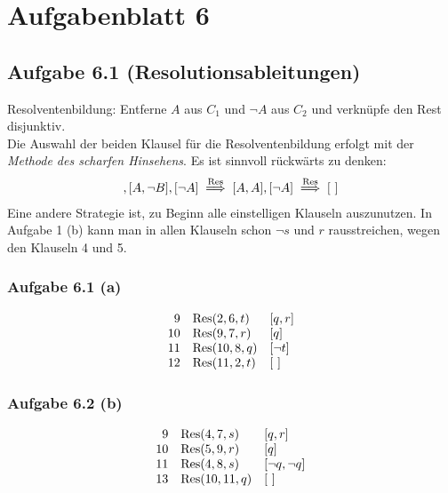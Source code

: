 
\section{Aufgabenblatt 6}
\subsection{Aufgabe 6.1 (Resolutionsableitungen)}
Resolventenbildung: Entferne $A$ aus $C_1$ und $\neg A$ aus $C_2$ und verknüpfe den Rest disjunktiv.\\
Die Auswahl der beiden Klausel für die Resolventenbildung erfolgt mit der \textit{Methode des scharfen Hinsehens}. 
Es ist sinnvoll rückwärts zu denken:
\begin{align*}
	[A,B],[A,\neg B],[\neg A]\Reso[A,A],[\neg A]\Reso[~]
\end{align*}
Eine andere Strategie ist, zu Beginn alle einstelligen Klauseln auszunutzen. 
In Aufgabe 1 (b) kann man in allen Klauseln schon $\neg s$ und $r$ rausstreichen, wegen den Klauseln 4 und 5.

\subsubsection{Aufgabe 6.1 (a)}
\begin{align*}
	\begin{array}{rll}
		9 & \operatorname{Res}(2,6,t) & [q,r]\\
		10 & \operatorname{Res}(9, 7,r) & [q]\\
		11 & \operatorname{Res}(10,8,q) & [\neg t]\\
		12 & \operatorname{Res}(11,2, t) & [~]
	\end{array}
\end{align*}

\subsubsection{Aufgabe 6.2 (b)}
\begin{align*}
	\begin{array}{rll}
		9 & \operatorname{Res}(4,7,s) & [q,r]\\
		10 & \operatorname{Res}(5,9,r) & [q]\\
		11 & \operatorname{Res}(4,8,s) & [\neg q,\neg q]\\
		13 & \operatorname{Res}(10,11,q) & [~]
	\end{array}
\end{align*}

